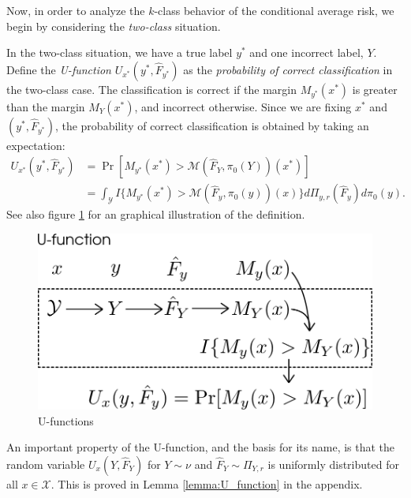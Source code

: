 \documentclass[12pt]{article}
\begin{document}
Now, in order to analyze the $k$-class behavior of the conditional
average risk, we begin by considering the \emph{two-class} situation.

In the two-class situation, we have a true label $y^*$ and one
incorrect label, $Y$.  Define the \emph{U-function}
$U_{x^*}(y^*, \hat{F}_{y^*})$ as the \emph{probability of correct
classification} in the two-class case.
The classification is correct if the margin
$M_{y^*}(x^*)$ is greater than the margin $M_Y(x^*)$, and incorrect
otherwise.  
Since we are fixing $x^*$ and $(y^*, \hat{F}_{y^*})$, the
probability of correct classification is obtained by taking an expectation:
\begin{align}\label{eq:U_function}
U_{x^*}(y^*, \hat{F}_{y^*}) &= \Pr[M_{y^*}(x^*) > \mathcal{M}(\hat{F}_Y, \pi_0(Y))(x^*)]
\\&= \int_{\mathcal{Y}} 
I\{
M_{y^*}(x^*) > \mathcal{M}(\hat{F}_{y}, \pi_0(y))(x)
\}
d\Pi_{y, r}(\hat{F}_y)
d\pi_0(y).
\end{align}
See also figure \ref{fig:U_function} for an graphical illustration of
the definition.

\begin{figure}[h]
\centering
\includegraphics[scale = 0.4]{extrapolation_figures/U_function.png}
\caption{U-functions}\label{fig:U_function}
\end{figure}

An important property of the U-function, and the basis for its name,
is that the random variable $U_x(Y, \hat{F}_Y)$ for $Y \sim \nu$ and
$\hat{F}_Y \sim \Pi_{Y, r}$ is uniformly distributed for all
$x \in \mathcal{X}$.  This is proved in Lemma \ref{lemma:U_function}
in the appendix.
\end{document}
